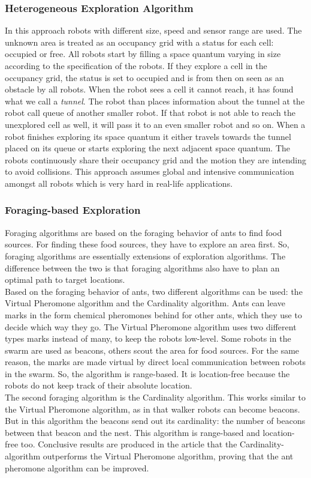 	\subsubsection{Heterogeneous Exploration Algorithm}
	In this approach robots with different size, speed and sensor range are used.
	The unknown area is treated as an occupancy grid with a status for each cell: occupied or free.
	All robots start by filling a space quantum varying in size according to the specification of the robots.
	If they explore a cell in the occupancy grid, the status is set to occupied and is from then on seen as an obstacle by all robots.
	When the robot sees a cell it cannot reach, it has found what we call a \emph{tunnel}.
	The robot than places information about the tunnel at the robot call queue of another smaller robot.
	If that robot is not able to reach the unexplored cell as well, it will pass it to an even smaller robot and so on.
	When a robot finishes exploring its space quantum it either travels towards the tunnel placed on its queue or starts exploring the next adjacent space quantum.
	The robots continuously share their occupancy grid and the motion they are intending to avoid collisions.
	This approach assumes global and intensive communication amongst all robots which is very hard in real-life applications. \cite{singh1993map}

	\subsubsection{Foraging-based Exploration}
	Foraging algorithms are based on the foraging behavior of ants to find food sources. \cite{hoff2010two}
	For finding these food sources, they have to explore an area first. 
	So, foraging algorithms are essentially extensions of exploration algorithms. 
	The difference between the two is that foraging algorithms also have to plan an optimal path to target locations. \\	
	Based on the foraging behavior of ants, two different algorithms can be used: the Virtual Pheromone algorithm and the Cardinality algorithm.
	Ants can leave marks in the form chemical pheromones behind for other ants, which they use to decide which way they go. 
	The Virtual Pheromone algorithm uses two different types marks instead of many, to keep the robots low-level. 
	Some robots in the swarm are used as beacons, others scout the area for food sources. 
	For the same reason, the marks are made virtual by direct local communication between robots in the swarm.
	So, the algorithm is range-based. 
	It is location-free because the robots do not keep track of their absolute location.\\
	The second foraging algorithm is the Cardinality algorithm. 
	This works similar to the Virtual Pheromone algorithm, as in that walker robots can become beacons. 
	But in this algorithm the beacons send out its cardinality: the number of beacons between that beacon and the nest. 
	This algorithm is range-based and location-free too.
	Conclusive results are produced in the article that the Cardinality-algorithm outperforms the Virtual Pheromone algorithm, proving that the ant pheromone algorithm can be improved.\\

